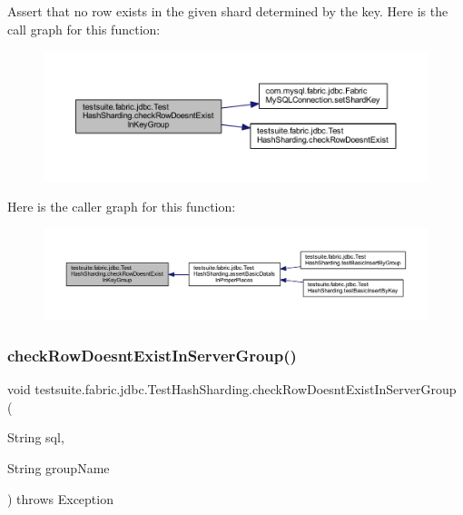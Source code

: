 Assert that no row exists in the given shard determined by the key. Here is the call graph for this function\+:
\nopagebreak
\begin{figure}[H]
\begin{center}
\leavevmode
\includegraphics[width=350pt]{classtestsuite_1_1fabric_1_1jdbc_1_1_test_hash_sharding_aa64b14c5407a2f6c4128fa8bf3f27b6f_cgraph}
\end{center}
\end{figure}
Here is the caller graph for this function\+:
\nopagebreak
\begin{figure}[H]
\begin{center}
\leavevmode
\includegraphics[width=350pt]{classtestsuite_1_1fabric_1_1jdbc_1_1_test_hash_sharding_aa64b14c5407a2f6c4128fa8bf3f27b6f_icgraph}
\end{center}
\end{figure}
\mbox{\label{classtestsuite_1_1fabric_1_1jdbc_1_1_test_hash_sharding_afe45f293836ac4ee4e67255e208fb36b}} 
\subsubsection{\texorpdfstring{check\+Row\+Doesnt\+Exist\+In\+Server\+Group()}{checkRowDoesntExistInServerGroup()}}
{\footnotesize\ttfamily void testsuite.\+fabric.\+jdbc.\+Test\+Hash\+Sharding.\+check\+Row\+Doesnt\+Exist\+In\+Server\+Group (\begin{DoxyParamCaption}\item[{String}]{sql,  }\item[{String}]{group\+Name }\end{DoxyParamCaption}) throws Exception\hspace{0.3cm}{\ttfamily [protected]}}

